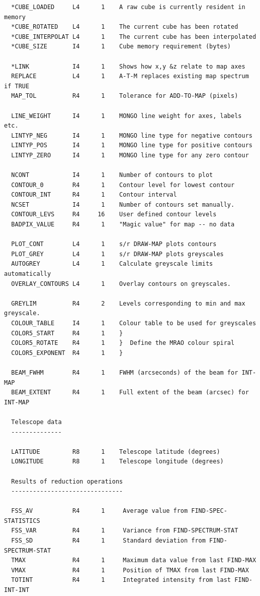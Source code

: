 \documentclass[11pt,twoside]{report}
\begin{document}
\begin{verbatim}
  *CUBE_LOADED     L4      1    A raw cube is currently resident in memory
  *CUBE_ROTATED    L4      1    The current cube has been rotated
  *CUBE_INTERPOLAT L4      1    The current cube has been interpolated
  *CUBE_SIZE       I4      1    Cube memory requirement (bytes)

  *LINK            I4      1    Shows how x,y &z relate to map axes
  REPLACE          L4      1    A-T-M replaces existing map spectrum if TRUE
  MAP_TOL          R4      1    Tolerance for ADD-TO-MAP (pixels)

  LINE_WEIGHT      I4      1    MONGO line weight for axes, labels etc.
  LINTYP_NEG       I4      1    MONGO line type for negative contours
  LINTYP_POS       I4      1    MONGO line type for positive contours
  LINTYP_ZERO      I4      1    MONGO line type for any zero contour

  NCONT            I4      1    Number of contours to plot
  CONTOUR_0        R4      1    Contour level for lowest contour
  CONTOUR_INT      R4      1    Contour interval
  NCSET            I4      1    Number of contours set manually.
  CONTOUR_LEVS     R4     16    User defined contour levels
  BADPIX_VALUE     R4      1    "Magic value" for map -- no data

  PLOT_CONT        L4      1    s/r DRAW-MAP plots contours
  PLOT_GREY        L4      1    s/r DRAW-MAP plots greyscales
  AUTOGREY         L4      1    Calculate greyscale limits automatically
  OVERLAY_CONTOURS L4      1    Overlay contours on greyscales.

  GREYLIM          R4      2    Levels corresponding to min and max greyscale.
  COLOUR_TABLE     I4      1    Colour table to be used for greyscales
  COLOR5_START     R4      1    }
  COLOR5_ROTATE    R4      1    }  Define the MRAO colour spiral
  COLOR5_EXPONENT  R4      1    }

  BEAM_FWHM        R4      1    FWHM (arcseconds) of the beam for INT-MAP
  BEAM_EXTENT      R4      1    Full extent of the beam (arcsec) for INT-MAP

  Telescope data
  --------------

  LATITUDE         R8      1    Telescope latitude (degrees)
  LONGITUDE        R8      1    Telescope longitude (degrees)

  Results of reduction operations
  -------------------------------

  FSS_AV           R4      1     Average value from FIND-SPEC-STATISTICS
  FSS_VAR          R4      1     Variance from FIND-SPECTRUM-STAT
  FSS_SD           R4      1     Standard deviation from FIND-SPECTRUM-STAT
  TMAX             R4      1     Maximum data value from last FIND-MAX
  VMAX             R4      1     Position of TMAX from last FIND-MAX
  TOTINT           R4      1     Integrated intensity from last FIND-INT-INT


\end{verbatim}
\end{document}
